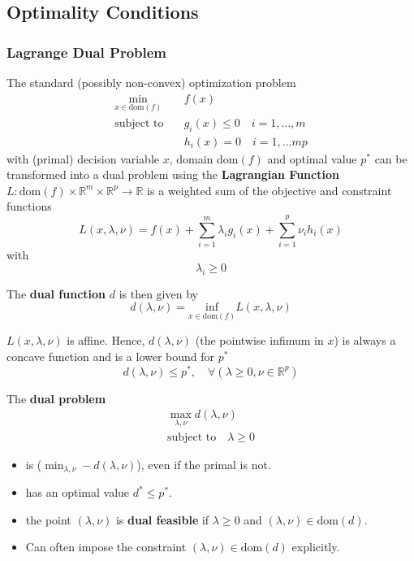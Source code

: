 \subsection{Optimality Conditions}

\subsubsection{Lagrange Dual Problem}

The standard (possibly non-convex) optimization problem
\begin{align*}
    \min_{x\in\text{dom}(f)} & f(x)                                \\
    \text{subject to}\quad   & g_i(x)\leq 0 \quad i = 1, \ldots, m \\
                             & h_i(x) = 0 \quad i = 1, \ldots m p
\end{align*}
with (primal) decision variable $x$, domain dom$(f)$ and optimal value $p^*$ can be transformed into a dual problem using the \textbf{Lagrangian Function} $L: \mathrm{dom}\left(f\right)\times\mathbb{R}^m\times\mathbb{R}^p\to\mathbb{R}$ is a weighted sum of the objective and constraint functions
\begin{equation*}
    L(x,\lambda,\nu)=f(x)+\sum_{i=1}^{m}\lambda_i g_i(x) + \sum_{i=1}^{p}\nu_i h_i(x)
\end{equation*}
with
\begin{equation*}
    \lambda_i \geq 0
\end{equation*}

The \textbf{dual function} $d$ is then given by
\begin{equation*}
    d(\lambda, \nu) = \underset{x\in\text{dom}(f)}{\text{inf}} L(x,\lambda,\nu)
\end{equation*}

$L(x,\lambda,\nu)$ is affine. Hence, $d(\lambda, \nu)$ (the pointwise infimum in $x$) is always a concave function and is a lower bound for $p^*$
\begin{equation*}
    d(\lambda,\nu)\leq p^*, \quad \forall(\lambda \geq 0, \nu \in \mathbb{R}^p)
\end{equation*}

The \textbf{dual problem}
\begin{gather*}
    \max_{\lambda,\nu} d(\lambda, \nu) \\
    \text{subject to}\quad \lambda \geq 0
\end{gather*}
\begin{itemize}
    \item is  ($\min_{\lambda,\nu} -d(\lambda, \nu) $), even if the primal is not. %
    \item has an optimal value $d^* \leq p^*$.
    \item the point $(\lambda,\nu)$ is \textbf{dual feasible} if $\lambda \geq 0$ and $(\lambda, \nu) \in \text{dom}(d)$.
    \item Can often impose the constraint $(\lambda, \nu)\in \mathrm{dom}(d)$ explicitly. %
\end{itemize}


